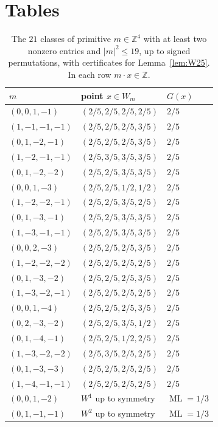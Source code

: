 \documentclass[12pt]{amsart}
\theoremstyle{definition}\newtheorem{definition}[theorem]{Definition}
\theoremstyle{remark}\newtheorem{remark}[theorem]{Remark}
\newcommand{\Z}{\mathbb Z}\newcommand{\R}{\mathbb R}\newcommand{\T}{\mathbb T}
\newcommand{\ML}{\operatorname{ML}}
\newcommand{\eucl}[1]{\lvert #1\rvert}
\newcommand{\Wone}{W^{1}}\newcommand{\Wtwo}{W^{2}}
\begin{document}
\appendix
\section{Tables}
\begin{table}[H]
\centering\small
\begin{tabular}{l l l}
\toprule
$m$ & point $x\in W_m$ & $G(x)$\\\midrule
$(0,0,1,-1)$ & $(2/5,2/5,2/5,2/5)$ & $2/5$\\
$(1,-1,-1,-1)$ & $(2/5,2/5,2/5,3/5)$ & $2/5$\\
$(0,1,-2,-1)$ & $(2/5,2/5,2/5,3/5)$ & $2/5$\\
$(1,-2,-1,-1)$ & $(2/5,3/5,3/5,3/5)$ & $2/5$\\
$(0,1,-2,-2)$ & $(2/5,2/5,3/5,3/5)$ & $2/5$\\
$(0,0,1,-3)$ & $(2/5,2/5,1/2,1/2)$ & $2/5$\\
$(1,-2,-2,-1)$ & $(2/5,2/5,3/5,2/5)$ & $2/5$\\
$(0,1,-3,-1)$ & $(2/5,2/5,3/5,3/5)$ & $2/5$\\
$(1,-3,-1,-1)$ & $(2/5,2/5,3/5,3/5)$ & $2/5$\\
$(0,0,2,-3)$ & $(2/5,2/5,2/5,3/5)$ & $2/5$\\
$(1,-2,-2,-2)$ & $(2/5,2/5,2/5,2/5)$ & $2/5$\\
$(0,1,-3,-2)$ & $(2/5,2/5,2/5,3/5)$ & $2/5$\\
$(1,-3,-2,-1)$ & $(2/5,2/5,2/5,2/5)$ & $2/5$\\
$(0,0,1,-4)$ & $(2/5,2/5,2/5,3/5)$ & $2/5$\\
$(0,2,-3,-2)$ & $(2/5,2/5,3/5,1/2)$ & $2/5$\\
$(0,1,-4,-1)$ & $(2/5,2/5,1/2,2/5)$ & $2/5$\\
$(1,-3,-2,-2)$ & $(2/5,3/5,2/5,2/5)$ & $2/5$\\
$(0,1,-3,-3)$ & $(2/5,2/5,2/5,2/5)$ & $2/5$\\
$(1,-4,-1,-1)$ & $(2/5,2/5,2/5,2/5)$ & $2/5$\\
\midrule
$(0,0,1,-2)$ & $\Wone$ up to symmetry & $\ML=1/3$\\
$(0,1,-1,-1)$ & $\Wtwo$ up to symmetry & $\ML=1/3$\\
\bottomrule
\end{tabular}
\caption{The $21$ classes of primitive $m\in\Z^4$ with at least two nonzero entries and $\eucl m^2\le19$, up to signed permutations, with certificates for Lemma~\ref{lem:W25}. In each row $m\cdot x\in\Z$.}
\label{tab:chars}
\end{table}
\end{document}
